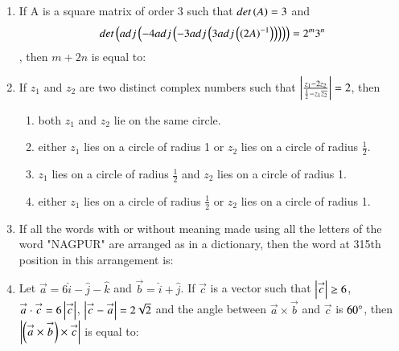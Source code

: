\documentclass[journal,12pt,onecolumn]{IEEEtran}
\theoremstyle{remark}
\begin{document}
\begin{enumerate}
\item If A is a square matrix of order 3 such that $det\left(A\right) = 3$ and $$det\left(adj\left(-4 adj\left(-3 adj\left(3 adj \left(\left(2A\right)^{-1}\right)\right)\right)\right)\right) = 2^m 3^n $$, then $m + 2n$ is equal to:
\begin{enumerate}
\end{enumerate}
\item If $z_1$ and $z_2$ are two distinct complex numbers such that $\left\vert\frac{z_1 -2z_2}{\frac{1}{2}-z_1 \overline{z_2}}\right\vert = 2$, then
\begin{enumerate}
\item both $z_1$ and $z_2$ lie on the same circle.
\item either $z_1$ lies on a circle of radius 1 or $z_2$ lies on a circle of radius $\frac{1}{2}$.
\item $z_1$ lies on a circle of radius $\frac{1}{2}$ and $z_2$ lies on a circle of radius 1.
\item either $z_1$ lies on a circle of radius $\frac{1}{2}$ or $z_2$ lies on a circle of radius 1.
\end{enumerate}
\item If all the words with or without meaning made using all the letters of the word "NAGPUR" are arranged as in a dictionary, then the word at 315th position in this arrangement is:
\begin{enumerate}
\end{enumerate}
\item Let $\overset{\rightarrow}{a} = 6\hat{i} - \hat{j} - \hat{k}$ and $\overset{\rightarrow}{b} = \hat{i} + \hat{j}$. If $\overset{\rightarrow}{c}$ is a vector such that $\left\vert\overset{\rightarrow}{c}\right\vert \geq 6$, $\overset{\rightarrow}{a}\cdot \overset{\rightarrow}{c}=6\left\vert\overset{\rightarrow}{c}\right\vert$, $\left\vert\overset{\rightarrow}{c}-\overset{\rightarrow}{a}\right\vert=2\sqrt{2}$ and the angle between $\overset{\rightarrow}{a} \times \overset{\rightarrow}{b}$ and $\overset{\rightarrow}{c}$ is $60\degree$, then $\left\vert\left(\overset{\rightarrow}{a} \times \overset{\rightarrow}{b}\right) \times \overset{\rightarrow}{c}\right\vert$ is equal to:

\end{enumerate}
\end{document}
